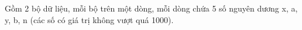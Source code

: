 Gồm 2 bộ dữ liệu, mỗi bộ trên một dòng, mỗi dòng chứa 5 số nguyên dương x, a, y, b, n (các số có giá trị không vượt quá 1000).